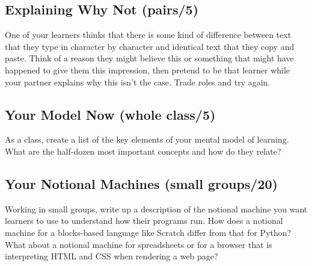 \subsection*{Explaining Why Not (pairs/5)}

One of your learners thinks that there is some kind of difference between
text that they type in character by character
and identical text that they copy and paste.
Think of a reason they might believe this
or something that might have happened to give them this impression,
then pretend to be that learner while your partner explains why this isn't the case.
Trade roles and try again.

\subsection*{Your Model Now (whole class/5)}

As a class,
create a list of the key elements of your mental model of learning.
What are the half-dozen most important concepts and how do they relate?

\subsection*{Your Notional Machines (small groups/20)}

Working in small groups,
write up a description of the notional machine you want learners to use
to understand how their programs run.
How does a notional machine for a blocks-based language like Scratch
differ from that for Python?
What about a notional machine for spreadsheets
or for a browser that is interpreting HTML and CSS when rendering a web page?
